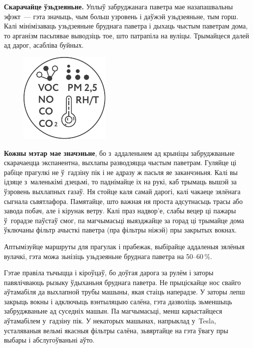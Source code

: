 \textbf{Скарачайце ўзьдзеяньне.} Уплыў забруджанага паветра мае назапашвальны эфэкт~--- гэта значыць, чым больш узровень і даўжэй узьдзеяньне, тым горш. Калі мінімізаваць узьдзеяньне бруднага паветра і дыхаць чыстым паветрам дома, то арганізм пасьпявае выводзіць тое, што патрапіла на вуліцы. Трымайцеся далей ад дарог, асабліва буйных.

\begin{figure}[htb!]
  \centering
  \includegraphics[scale=1.5]{willpower/ch11/4.pdf}
\end{figure}

\textbf{Кожны мэтар мае значэньне}, бо з~аддаленьнем ад крыніцы забруджваньне скарачаецца экспанентна, выхлапы разводзяцца чыстым паветрам. Гуляйце ці рабіце прагулкі не ў~гадзіну пік і не адразу ж пасьля яе заканчэньня. Калі вы ідзяце з~маленькімі дзецьмі, то паднімайце іх на рукі, каб трымаць вышэй за ўзровень выхлапных газаў. Ня стойце каля самай дарогі, калі чакаеце зялёнага сыгнала сьвятлафора. Памятайце, што важная ня проста адсутнасьць трасы або завода побач, але і кірунак ветру. Калі праз надвор'е, слабы вецер ці пажары ў~горадзе паўстаў смог, па магчымасьці выязджайце за горад ці трымайце дома ўключаны фільтр ачысткі паветра (пра фільтры ніжэй) пры закрытых вокнах.

Аптымізуйце маршруты для прагулак і прабежак, выбірайце аддаленыя зялёныя вулачкі, гэта можа зьнізіць узьдзеяньне бруднага паветра на 50--60\,\%.


Гэтае правіла тычыцца і кіроўцаў, бо доўгая дарога за рулём і заторы павялічваюць рызыку ўдыханьня бруднага паветра. Не прыціскайце нос свайго аўтамабіля да выхлапной трубы машыны, якая стаіць наперадзе. У заторы лепш закрыць вокны і адключыць вэнтыляцыю салёна, гэта дазволіць зьменшыць забруджваньне ад суседніх машын. Па магчымасьці, менш карыстайцеся аўтамабілем у~гадзіну пік. У некаторых машынах, напрыклад у~Tesla, усталяваныя вельмі якасныя фільтры салёна, зьвяртайце на гэта ўвагу пры выбары і абслугоўваньні аўто.

